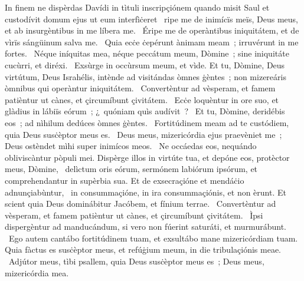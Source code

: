 { In finem ne dispèrdas Davídi in tìtuli inscripçiónem quando misit Saul et custodívit domum ejus ut eum interfìċeret}
{%
~ripe me de inimícïs meïs, Deus meus, et ab insurgèntibus in me líbera me. 
~Éripe me de operàntibus iniquitátem, et de vìrïs sángüinum salva me. 
~Quia ecċe ċepérunt ànimam meam~; irruvérunt in me fortes. 
~Néque iníquitas mea, néque peccátum meum, Dòmine~; sine iniquitáte cucùrri, et diréxi. 
~Exsùrge in occùrsum meum, et vìde. Et tu, Dòmine, Deus virtútum, Deus Israhélis, intènde ad visitándas òmnes ġèntes~; non mizereáris òmnibus qui operàntur iniquitátem. 
~Convertèntur ad vèsperam, et famem patièntur ut cànes, et çircumíbunt çivitátem. 
~Ecċe loquèntur in ore suo, et glàdius in lábiïs eórum~; ¿~quóniam quìs audívit~? 
~Et tu, Dòmine, deridébis eos~; ad nìhilum dedúces òmnes ġèntes. 
~Fortitúdinem meam ad te custódiem, quia Deus susċèptor meus es. 
~Deus meus, mizericórdia ejus praevèniet me~; Deus ostèndet mìhi super inimícos meos. 
~Ne occáedas eos, nequándo obliviscàntur pòpuli mei. Dispèrge illos in virtúte tua, et depóne eos, protèctor meus, Dòmine, 
~delìctum oris eórum, sermónem labiórum ipsórum, et comprehendantur in supèrbia sua. Et de exsecraçióne et mendáċio adnunçiabùntur, 
~in consummaçióne, in ira consummaçiónis, et non èrunt. Et scient quia Deus dominábitur Jacóbem, et fínium terrae. 
~Convertèntur ad vèsperam, et famem patièntur ut cànes, et çircumíbunt çivitátem. 
~Ìpsi dispergèntur ad manducándum, si vero non fúerint saturáti, et murmurábunt. 
~Ego autem cantábo fortitúdinem tuam, et exsultábo mane mizericórdiam tuam. Quia fàctus es susċèptor meus, et refúġium meum, in die tribulaçiónis meae. 
~Adjútor meus, tìbi psallem, quia Deus susċèptor meus es~; Deus meus, mizericórdia mea. 
}
